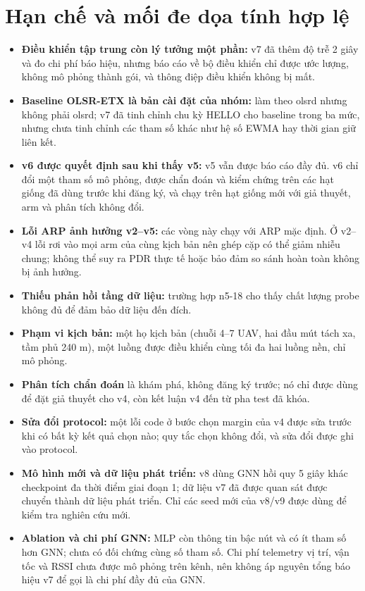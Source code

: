 \documentclass[12pt,a4paper]{report}
\begin{document}


\section{Hạn chế và mối đe dọa tính hợp lệ}
\begin{itemize}
  \item \textbf{Điều khiển tập trung còn lý tưởng một phần:} v7 đã thêm độ trễ 2 giây và đo chi phí báo hiệu, nhưng báo cáo về bộ điều khiển chỉ được ước lượng, không mô phỏng thành gói, và thông điệp điều khiển không bị mất.
  \item \textbf{Baseline OLSR-ETX là bản cài đặt của nhóm:} làm theo olsrd nhưng không phải olsrd; v7 đã tinh chỉnh chu kỳ HELLO cho baseline trong ba mức, nhưng chưa tinh chỉnh các tham số khác như hệ số EWMA hay thời gian giữ liên kết.
  \item \textbf{v6 được quyết định sau khi thấy v5:} v5 vẫn được báo cáo đầy đủ. v6 chỉ đổi một tham số mô phỏng, được chẩn đoán và kiểm chứng trên các hạt giống đã dùng trước khi đăng ký, và chạy trên hạt giống mới với giả thuyết, arm và phân tích không đổi.
  \item \textbf{Lỗi ARP ảnh hưởng v2--v5:} các vòng này chạy với ARP mặc định. Ở v2--v4 lỗi rơi vào mọi arm của cùng kịch bản nên ghép cặp có thể giảm nhiễu chung; không thể suy ra PDR thực tế hoặc bảo đảm so sánh hoàn toàn không bị ảnh hưởng.
  \item \textbf{Thiếu phản hồi tầng dữ liệu:} trường hợp n5-18 cho thấy chất lượng probe không đủ để đảm bảo dữ liệu đến đích.
  \item \textbf{Phạm vi kịch bản:} một họ kịch bản (chuỗi 4--7 UAV, hai đầu mút tách xa, tầm phủ 240 m), một luồng được điều khiển cùng tối đa hai luồng nền, chỉ mô phỏng.
  \item \textbf{Phân tích chẩn đoán} là khám phá, không đăng ký trước; nó chỉ được dùng để đặt giả thuyết cho v4, còn kết luận v4 đến từ pha test đã khóa.
  \item \textbf{Sửa đổi protocol:} một lỗi code ở bước chọn margin của v4 được sửa trước khi có bất kỳ kết quả chọn nào; quy tắc chọn không đổi, và sửa đổi được ghi vào protocol.
  \item \textbf{Mô hình mới và dữ liệu phát triển:} v8 dùng GNN hồi quy 5 giây khác checkpoint đa thời điểm giai đoạn 1; dữ liệu v7 đã được quan sát được chuyển thành dữ liệu phát triển. Chỉ các seed mới của v8/v9 được dùng để kiểm tra nghiên cứu mới.
  \item \textbf{Ablation và chi phí GNN:} MLP còn thông tin bậc nút và có ít tham số hơn GNN; chưa có đối chứng cùng số tham số. Chi phí telemetry vị trí, vận tốc và RSSI chưa được mô phỏng trên kênh, nên không áp nguyên tổng báo hiệu v7 để gọi là chi phí đầy đủ của GNN.

\end{itemize}
\end{document}
